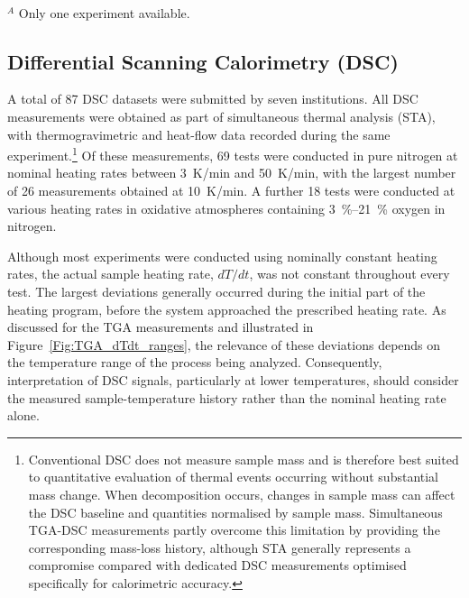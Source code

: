 \documentclass{book}
\begin{document}
	\begin{table}[htbp]
		\centering
		\caption{Summary of values of interest derived from the TGA measurements. Reported quantities include peak normalized mass loss rate, temperature of peak mass loss rate, onset temperature, apparent moisture content, and residue yield measured at 700~K and 950~K for experiments conducted under different heating rates and atmospheres. Residue yields are reported relative to both the initial sample mass, $m_0$, and the dry reference mass at 400~K, $m_{400}$.}
		\label{tab:wood_tga_results}
		\resizebox{\textwidth}{!}{%
		}\\
		\raggedright
		$^A$ Only one experiment available.\\
	\end{table}



\newpage
\subsection{Differential Scanning Calorimetry (DSC)}

A total of 87 DSC datasets were submitted by seven institutions. All DSC measurements were obtained as part of simultaneous thermal analysis (STA), with thermogravimetric and heat-flow data recorded during the same experiment.\footnote{Conventional DSC does not measure sample mass and is therefore best suited to quantitative evaluation of thermal events occurring without substantial mass change. When decomposition occurs, changes in sample mass can affect the DSC baseline and quantities normalised by sample mass. Simultaneous TGA-DSC measurements partly overcome this limitation by providing the corresponding mass-loss history, although STA generally represents a compromise compared with dedicated DSC measurements optimised specifically for calorimetric accuracy.} Of these measurements, 69 tests were conducted in pure nitrogen at nominal heating rates between 3~K/min and 50~K/min, with the largest number of 26 measurements obtained at 10~K/min. A further 18 tests were conducted at various heating rates in oxidative atmospheres containing 3~\%--21~\% oxygen in nitrogen.

Although most experiments were conducted using nominally constant heating rates, the actual sample heating rate, $dT/dt$, was not constant throughout every test. The largest deviations generally occurred during the initial part of the heating program, before the system approached the prescribed heating rate. As discussed for the TGA measurements and illustrated in Figure~\ref{Fig:TGA_dTdt_ranges}, the relevance of these deviations depends on the temperature range of the process being analyzed. Consequently, interpretation of DSC signals, particularly at lower temperatures, should consider the measured sample-temperature history rather than the nominal heating rate alone.\\
\end{document}
